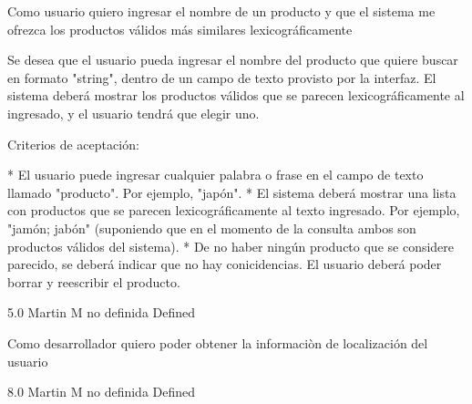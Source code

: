 	{Como usuario quiero ingresar el nombre de un producto y que el sistema me ofrezca los productos válidos más similares lexicográficamente} %
	{Se desea que el usuario pueda ingresar el nombre del producto que quiere
buscar en formato "string", dentro de un campo de texto provisto por la
interfaz. El sistema deberá mostrar los productos válidos que se parecen
lexicográficamente al ingresado, y el usuario tendrá que elegir uno.

  
Criterios de aceptación:

* El usuario puede ingresar cualquier palabra o frase en el campo de texto llamado "producto". Por ejemplo, "japón".  
* El sistema deberá mostrar una lista con productos que se parecen lexicográficamente al texto ingresado. Por ejemplo, "jamón; jabón" (suponiendo que en el momento de la consulta ambos son productos válidos del sistema).  
* De no haber ningún producto que se considere parecido, se deberá indicar que no hay conicidencias. El usuario deberá poder borrar y reescribir el producto.

} %
	{} %
	{5.0} %
	{Martin M} %
	{no definida} %
	{Defined} %


\vspace{20pt}

	{Como desarrollador quiero poder obtener la informaciòn de localización del usuario} %
	{

} %
	{} %
	{8.0} %
	{Martin M} %
	{no definida} %
	{Defined} %


\vspace{20pt}

